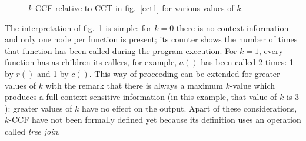 \documentclass[a4paper,10pt]{report}
\begin{document}
\begin{figure}[h]

\begin{center}
\end{center}

\caption{$k$-CCF relative to CCT in fig.~\ref{cct1} for various values of $k$.}
\label{kccf1}

\end{figure}

The interpretation of fig.~\ref{kccf1} is simple: for $k=0$ there is no context
information and only one node per function is present; its counter shows the number of times that function has been called during the program execution. For $k=1$, every function has as children its callers, for example, $a()$ has been called $2$ times: 1 by $r()$ and 1 by $c()$. This way of proceeding can be extended for greater values of $k$ with the remark that 
there is always a maximum $k$-value which produces a full context-sensitive information 
(in this example, that value of $k$ is $3$): greater values of $k$ have no effect on the output. Apart of these considerations, $k$-CCF have not been formally defined yet because its definition uses an operation called \emph{tree join}.
\end{document}

